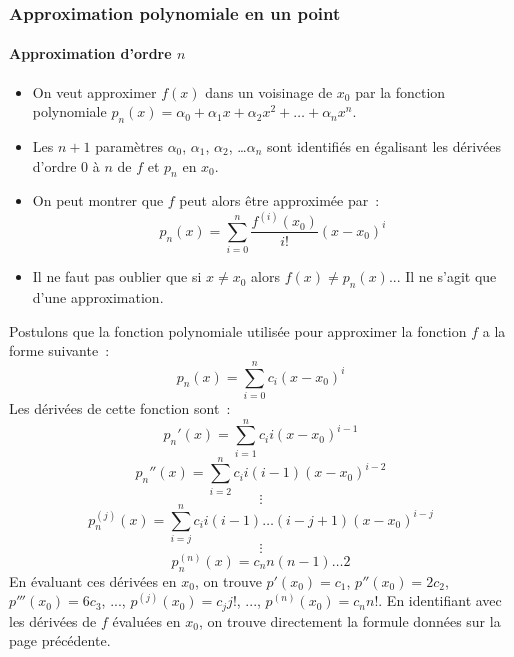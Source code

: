 \documentclass[10pt,notheorems]{beamer}
\theoremstyle{plain}
\theoremstyle{definition} %
\begin{document}
\begin{frame}
  \frametitle{Approximation polynomiale en un point}
  \framesubtitle{Approximation d'ordre $n$}
  \hypertarget{slide_taylor_7}{}

  \bigskip

  \begin{itemize}

  \item On veut approximer $f(x)$ dans un voisinage de $x_0$ par la fonction polynomiale $p_n(x) = \alpha_0+\alpha_1 x + \alpha_2 x^2 +\ldots+ \alpha_n x^n$.\newline

  \item Les $n+1$ paramètres $\alpha_0$, $\alpha_1$, $\alpha_2$, \ldots $\alpha_n$ sont identifiés en égalisant les dérivées d'ordre 0 à $n$ de $f$ et $p_n$ en $x_0$.\newline

  \item On peut montrer que $f$ peut alors être approximée par~:
    \[
      p_n(x) = \sum_{i=0}^n\frac{f^{(i)}(x_0)}{i!}(x-x_0)^i
    \]

  \item[\dbend] Il ne faut pas oublier que si $x\neq x_0$ alors $f(x)\neq p_n(x)$... Il ne s'agit que d'une approximation.
  \end{itemize}

\end{frame}


\begin{notes}
  Postulons que la fonction polynomiale utilisée pour approximer la fonction $f$ a la forme suivante~:
  \[
    p_n(x) = \sum_{i=0}^n c_i (x-x_0)^i
  \]
  Les dérivées de cette fonction sont~:
  \[
    p_n'(x) = \sum_{i=1}^nc_i i (x-x_0)^{i-1}
  \]
  \[
    p_n''(x) = \sum_{i=2}^nc_i i (i-1)(x-x_0)^{i-2}
  \]
  \[
    \vdots
  \]
  \[
    p_n^{(j)}(x) = \sum_{i=j}^nc_i i (i-1)\ldots(i-j+1)(x-x_0)^{i-j}
  \]
  \[
    \vdots
  \]
  \[
    p_n^{(n)}(x) = c_n n (n-1) \ldots 2
  \]
  En évaluant ces dérivées en $x_0$, on trouve $p'(x_0)=c_1$, $p''(x_0)=2c_2$, $p'''(x_0)=6c_3$, ..., $p^{(j)}(x_0) = c_j j!$, ..., $p^{(n)}(x_0) = c_n n!$. En identifiant avec les dérivées de $f$ évaluées en $x_0$, on trouve directement la formule données sur la page précédente.
\end{notes}
\end{document}
